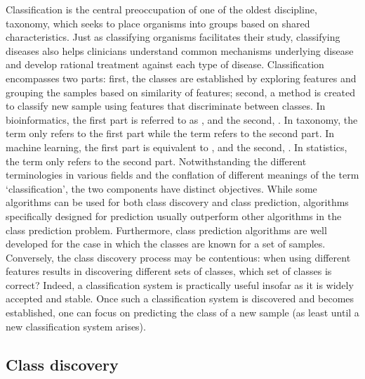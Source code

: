 Classification is the central preoccupation of one of the oldest discipline, taxonomy, which seeks to place organisms into groups based on shared characteristics. Just as classifying organisms facilitates their study, classifying diseases also helps clinicians understand common mechanisms underlying disease and develop rational treatment against each type of disease. Classification encompasses two parts: first, the classes are established by exploring features and grouping the samples based on similarity of features; second, a method is created to classify new sample using features that discriminate between classes. In bioinformatics, the first part is referred to as , and the second, . In taxonomy, the term  only refers to the first part while the term  refers to the second part. In machine learning, the first part is equivalent to , and the second, . In statistics, the term  only refers to the second part. Notwithstanding the different terminologies in various fields and the conflation of different meanings of the term `classification', the two components have distinct objectives. While some algorithms can be used for both class discovery and class prediction, algorithms specifically designed for prediction usually outperform other algorithms in the class prediction problem. Furthermore, class prediction algorithms are well developed for the case in which the classes are known for a set of samples. Conversely, the class discovery process may be contentious: when using different features results in discovering different sets of classes, which set of classes is correct? Indeed, a classification system is practically useful insofar as it is widely accepted and stable. Once such a classification system is discovered and becomes established, one can focus on predicting the class of a new sample (as least until a new classification system arises).

\subsection{Class discovery}


